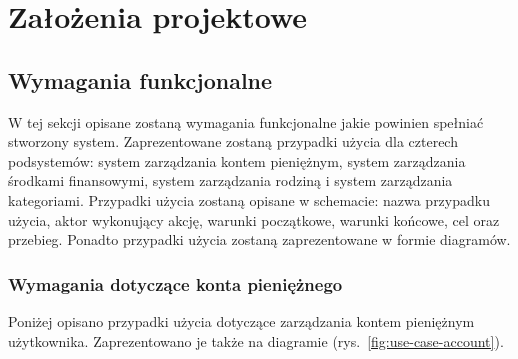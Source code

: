 \chapter{Założenia projektowe}
\label{chap:zalozenia-projektowe}
\section{Wymagania funkcjonalne}
\label{sec:wymagania-funkcjonalne}

W tej sekcji opisane zostaną wymagania funkcjonalne jakie powinien spełniać stworzony system. Zaprezentowane zostaną przypadki użycia dla czterech podsystemów: system zarządzania kontem pieniężnym, system zarządzania środkami finansowymi, system zarządzania rodziną i system zarządzania kategoriami. Przypadki użycia zostaną opisane w schemacie: nazwa przypadku użycia, aktor wykonujący akcję, warunki początkowe, warunki końcowe, cel oraz przebieg. Ponadto przypadki użycia zostaną zaprezentowane w formie diagramów.

\subsection{Wymagania dotyczące konta pieniężnego}
\label{subsec:wymagania-konto}
Poniżej opisano przypadki użycia dotyczące zarządzania kontem pieniężnym użytkownika. Zaprezentowano je także na diagramie (rys.~\ref{fig:use-case-account}).

